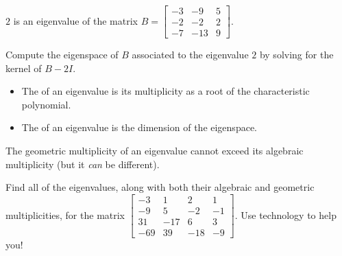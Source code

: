 \begin{applicationActivities}{4}{28}
\begin{activity}{5}
  $2$ is an eigenvalue of the matrix $B=\begin{bmatrix} -3 & -9 & 5 \\ -2 & -2 & 2 \\ -7 & -13 & 9 \end{bmatrix}$.

  Compute the eigenspace of $B$ associated to the eigenvalue $2$ by
  solving for the kernel of \(B-2I\).
\end{activity}

\begin{definition}

\begin{itemize}
\item The  of an eigenvalue is its multiplicity as a root of the characteristic polynomial.
\item The  of an eigenvalue is the dimension of the eigenspace.
\end{itemize}

\end{definition}

\begin{fact}
  The geometric multiplicity of an eigenvalue cannot exceed its
  algebraic multiplicity (but it \textit{can} be different).
\end{fact}


\begin{activity}{20}
   Find all of the eigenvalues, along with both their algebraic and geometric multiplicities, for the matrix $\begin{bmatrix} -3 & 1 & 2 & 1 \\ -9 & 5 & -2 & -1 \\ 31 & -17 & 6 & 3 \\ -69 & 39 & -18 & -9 \end{bmatrix}$.  Use technology to help you!
\end{activity}




\end{applicationActivities}
